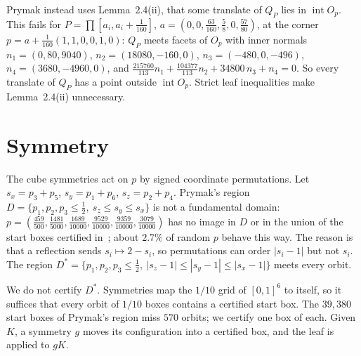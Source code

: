 \documentclass[11pt]{article}
\newcommand{\inter}{\operatorname{int}}
\begin{document}
Prymak instead uses Lemma~2.4(ii), that some translate of $Q_P$ lies in $\inter O_p$. This fails for
$P=\prod[a_i,a_i+\tfrac1{160}]$, $a=(0,0,\tfrac{63}{160},\tfrac58,0,\tfrac{57}{80})$, at the corner
$p=a+\tfrac1{160}(1,1,0,0,1,0)$: $Q_P$ meets facets of $O_p$ with inner normals
$n_1=(0,80,9040)$, $n_2=(18080,-160,0)$, $n_3=(-480,0,-496)$, $n_4=(3680,-4960,0)$, and
$\tfrac{215760}{113}n_1+\tfrac{104377}{113}n_2+34800\,n_3+n_4=0$. So every translate of $Q_P$ has a point outside
$\inter O_p$. Strict leaf inequalities make Lemma~2.4(ii) unnecessary.

\section{Symmetry}
The cube symmetries act on $p$ by signed coordinate permutations. Let $s_x=p_3+p_5$, $s_y=p_1+p_6$,
$s_z=p_2+p_4$. Prymak's region $D=\{p_1,p_2,p_3\le\tfrac12,\ s_z\le s_y\le s_x\}$ is not a fundamental domain:
$p=(\tfrac{459}{500},\tfrac{1481}{5000},\tfrac{1689}{10000},\tfrac{9529}{10000},\tfrac{9359}{10000},\tfrac{3079}{10000})$
has no image in $D$ or in the union of the start boxes certified in~\cite{Pry}; about $2.7\%$ of random $p$ behave
this way. The reason is that a reflection sends $s_i\mapsto 2-s_i$, so permutations can order $|s_i-1|$ but not
$s_i$. The region $D^*=\{p_1,p_2,p_3\le\tfrac12,\ |s_z-1|\le|s_y-1|\le|s_x-1|\}$ meets every orbit.

We do not certify $D^*$. Symmetries map the $1/10$ grid of $[0,1]^6$ to itself, so it suffices that every orbit
of $1/10$ boxes contains a certified start box. The $39{,}380$ start boxes of Prymak's region miss $570$ orbits;
we certify one box of each. Given $K$, a symmetry $g$ moves its configuration into a certified box, and the leaf is
applied to $gK$.
\end{document}
